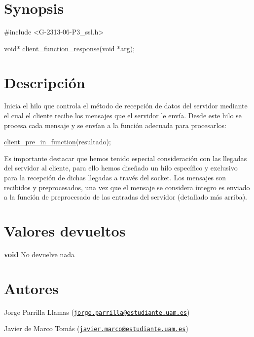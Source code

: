 \hypertarget{client_function_response_synopsis_2}{}\section{Synopsis}\label{client_function_response_synopsis_2}

\begin{DoxyCode}
\textcolor{preprocessor}{#include <G-2313-06-P3\_ssl.h>}

\textcolor{keywordtype}{void}* \hyperlink{G-2313-06-P2__client_8h_afbd2dc7b3224fc3d2c5c9233b307c376}{client\_function\_response}(\textcolor{keywordtype}{void} *arg);
\end{DoxyCode}
 \hypertarget{client_function_response_descripcion_2}{}\section{Descripción}\label{client_function_response_descripcion_2}
Inicia el hilo que controla el método de recepción de datos del servidor mediante el cual el cliente recibe los mensajes que el servidor le envía. Desde este hilo se procesa cada mensaje y se envían a la función adecuada para procesarlos\+: 
\begin{DoxyCode}
\hyperlink{G-2313-06-P2__client_8h_aa74c686c447b275e6a8cf36419033e81}{client\_pre\_in\_function}(resultado);
\end{DoxyCode}
 Es importante destacar que hemos tenido especial consideración con las llegadas del servidor al cliente, para ello hemos diseñado un hilo específico y exclusivo para la recepción de dichas llegadas a través del socket. Los mensajes son recibidos y preprocesados, una vez que el mensaje se considera íntegro es enviado a la función de preprocesado de las entradas del servidor (detallado más arriba). \hypertarget{client_function_response_return_2}{}\section{Valores devueltos}\label{client_function_response_return_2}

\begin{DoxyItemize}
\item {\bfseries void} No devuelve nada 
\end{DoxyItemize}\hypertarget{client_function_response_authors_2}{}\section{Autores}\label{client_function_response_authors_2}

\begin{DoxyItemize}
\item Jorge Parrilla Llamas (\href{mailto:jorge.parrilla@estudiante.uam.es}{\tt jorge.\+parrilla@estudiante.\+uam.\+es}) 
\item Javier de Marco Tomás (\href{mailto:javier.marco@estudiante.uam.es}{\tt javier.\+marco@estudiante.\+uam.\+es}) 
\end{DoxyItemize}